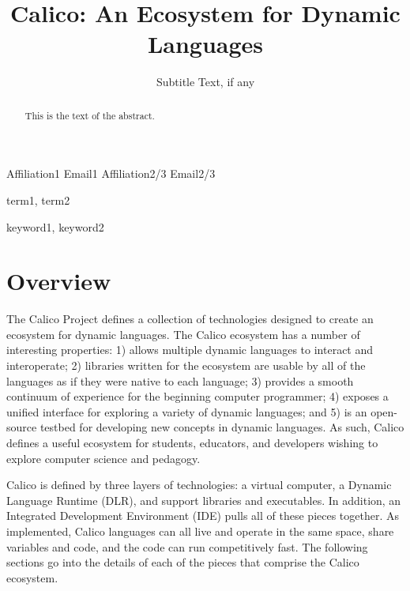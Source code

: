 \documentclass[preprint]{sigplanconf}
\begin{document}
\copyrightdata{[to be supplied]} 




\title{Calico: An Ecosystem for Dynamic Languages}
\subtitle{Subtitle Text, if any}


           {Affiliation1}
           {Email1}
           {Affiliation2/3}
           {Email2/3}


\maketitle


\begin{abstract}
This is the text of the abstract.
\end{abstract}




\terms
term1, term2


\keywords
keyword1, keyword2


\section{Overview}


The Calico Project defines a collection of technologies designed to create an ecosystem for dynamic languages. The Calico ecosystem has a number of interesting properties: 1) allows multiple dynamic languages to interact and interoperate; 2) libraries written for the ecosystem are usable by all of the languages as if they were native to each language; 3) provides a smooth continuum of experience for the beginning computer programmer; 4) exposes a unified interface for exploring a variety of dynamic languages; and 5) is an open-source testbed for developing new concepts in dynamic languages. As such, Calico defines a useful ecosystem for students, educators, and developers wishing to explore computer science and pedagogy.


Calico is defined by three layers of technologies: a virtual computer, a Dynamic Language Runtime (DLR), and support libraries and executables. In addition, an Integrated Development Environment (IDE) pulls all of these pieces together. As implemented, Calico languages can all live and operate in the same space, share variables and code, and the code can run competitively fast. The following sections go into the details of each of the pieces that comprise the Calico ecosystem.
\end{document}
